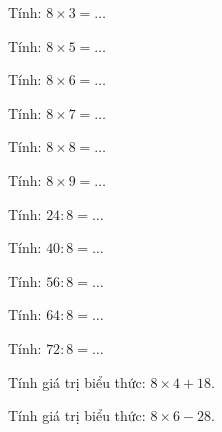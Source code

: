 \begin{ex}
Tính: $8 \times 3 = \dots$
\end{ex}

\begin{ex}
Tính: $8 \times 5 = \dots$
\end{ex}

\begin{ex}
Tính: $8 \times 6 = \dots$
\end{ex}

\begin{ex}
Tính: $8 \times 7 = \dots$
\end{ex}

\begin{ex}
Tính: $8 \times 8 = \dots$
\end{ex}

\begin{ex}
Tính: $8 \times 9 = \dots$
\end{ex}

\begin{ex}
Tính: $24 : 8 = \dots$
\end{ex}

\begin{ex}
Tính: $40 : 8 = \dots$
\end{ex}

\begin{ex}
Tính: $56 : 8 = \dots$
\end{ex}

\begin{ex}
Tính: $64 : 8 = \dots$
\end{ex}

\begin{ex}
Tính: $72 : 8 = \dots$
\end{ex}

\begin{ex}
Tính giá trị biểu thức: $8 \times 4 + 18$.
\end{ex}

\begin{ex}
Tính giá trị biểu thức: $8 \times 6 - 28$.
\end{ex}

